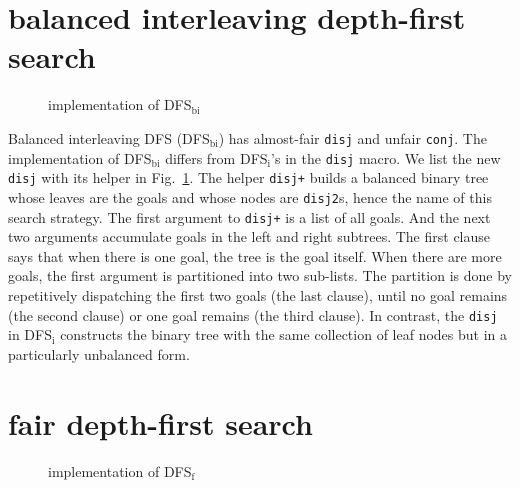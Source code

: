 \documentclass[format=acmlarge, review=true, authordraft=true]{acmart}
\newcommand{\conj}{\texttt{conj}}
\newcommand{\disj}{\texttt{disj}}
\newcommand{\DFSf }[0]{DFS$_\textrm{f}$}
\newcommand{\DFSbi}[0]{DFS$_\textrm{bi}$}
\begin{document}
\section{balanced interleaving depth-first search}

\begin{figure}
	
	\caption{implementation of \DFSbi{}}
	\label{balanced-disj}
\end{figure}

Balanced interleaving DFS (DFS$_\textrm{bi}$) has almost-fair \disj{} and unfair 
\conj{}. The implementation of DFS$_\textrm{bi}$ differs from 
DFS$_\textrm{i}$'s 
in the \disj{} macro. We list the new \disj{} with its helper in 
Fig.~\ref{balanced-disj}. The helper \texttt{disj+} builds a balanced binary 
tree 
whose leaves are the goals and whose nodes are \texttt{disj2}s, hence the name 
of 
this search strategy. The first argument 
to \texttt{disj+} is a list of all goals. And the next two arguments accumulate 
goals in 
the left and right subtrees. The first clause says that when there is one goal, 
the tree is the goal itself. When there are more goals, the first argument is 
partitioned into two sub-lists. The partition is done by repetitively 
dispatching the first two goals (the last clause), until no goal remains (the 
second clause) or one goal remains (the third clause). In contrast, the \disj{} 
in DFS$_\textrm{i}$ constructs the binary tree with the same collection of leaf 
nodes but in a particularly unbalanced form.



\section{fair depth-first search}

\begin{figure}
	
	\caption{implementation of \DFSf{}}
	\label{fDFS}
\end{figure}
\end{document}

